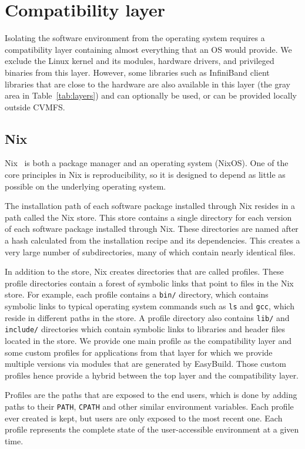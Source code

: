 \documentclass[sigconf]{acmart}
\begin{document}
\section{Compatibility layer}
\label{sec:Compatibility_layer}
Isolating the software environment from the operating system requires a compatibility layer containing almost everything that an OS would provide. We exclude the Linux kernel and its modules, hardware drivers, and privileged binaries from this layer. However, some libraries such as InfiniBand client libraries that are close to the hardware are also available in this layer (the gray area in Table~\ref{tab:layers}) and can optionally be used, or can be provided locally outside CVMFS.

\subsection{Nix}
\label{sub:Nix}
Nix~\cite{Nix} is both a package manager and an operating system (NixOS). One of the core principles in Nix is reproducibility, so it is designed to depend as little as possible on the underlying operating system. 

The installation path of each software package installed through Nix resides in a path called the Nix store. This store contains a single directory for each version of each software package installed through Nix. These directories are named after a hash calculated from the installation recipe and its dependencies. This creates a very large number of subdirectories, many of which contain nearly identical files. 

In addition to the store, Nix creates directories that are called profiles. These profile directories contain a forest of symbolic links that point to files in the Nix store. For example, each profile contains a \texttt{bin/} directory, which contains symbolic links to typical operating system commands such as \texttt{ls} and \texttt{gcc}, which reside in different paths in the store. A profile directory also contains \texttt{lib/} and \texttt{include/} directories which contain symbolic links to libraries and header files located in the store. We provide one main profile as the compatibility layer and some custom profiles for applications from that layer for which we provide multiple versions via modules that are generated by EasyBuild. Those custom profiles hence provide a hybrid between the top layer and the compatibility layer.

Profiles are the paths that are exposed to the end users, which is done by adding paths to their \texttt{PATH}, \texttt{CPATH} and other similar environment variables. Each profile ever created is kept, but users are only exposed to the most recent one. Each profile represents the complete state of the user-accessible environment at a given time.
\end{document}
